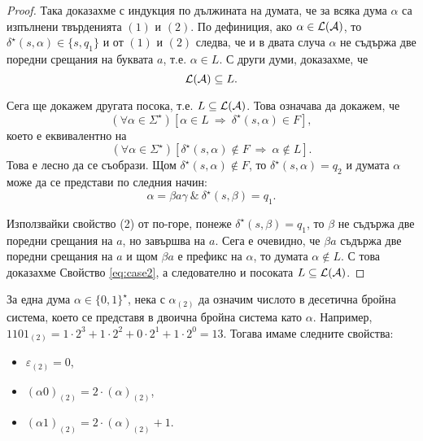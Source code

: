 \begin{proof}
 Така доказахме с индукция по дължината на думата, че за всяка дума $\alpha$
 са  изпълнени твърденията $(1)$ и $(2)$. По дефиниция, ако $\alpha \in \mathcal{L}(\mathcal{A})$,
 то $\delta^\star(s,\alpha) \in \{s,q_1\}$ и от $(1)$ и $(2)$ следва, че и в двата случа
 $\alpha$ не съдържа две поредни срещания на буквата $a$, т.е. $\alpha \in L$.
 С други думи, доказахме, че 
 \[\mathcal{L}(\mathcal{A}) \subseteq L.\]

 Сега ще докажем другата посока, т.е. $L \subseteq \mathcal{L}(\mathcal{A})$.
 Това означава да докажем, че
 \[(\forall \alpha \in \Sigma^\star)[\alpha \in L\ \Rightarrow\ \delta^\star(s,\alpha) \in F],\]
 което е еквивалентно на
 \begin{equation}
   \label{eq:case2}
   (\forall \alpha \in \Sigma^\star)[\delta^\star(s,\alpha) \not\in F \ \Rightarrow\ \alpha\not\in L].
 \end{equation}
 Това е лесно да се съобрази.
 Щом $\delta^\star(s,\alpha) \not\in F$, то 
 $\delta^\star(s,\alpha) = q_2$ и думата $\alpha$ може да се представи по следния начин:
 \[\alpha = \beta a \gamma\ \&\ \delta^\star(s,\beta) = q_1.\]
 
 Използвайки свойство (2) от по-горе, понеже $\delta^\star(s,\beta) = q_1$, то
 $\beta$ не съдържа две поредни срещания на $a$, но завършва на $a$.
 Сега е очевидно, че $\beta a$ съдържа две поредни срещания на $a$ и 
 щом $\beta a$ е префикс на $\alpha$, то думата $\alpha \not\in L$.
 С това доказахме Свойство \ref{eq:case2}, а следователно и посоката $L\subseteq \mathcal{L}(\mathcal{A})$.
\end{proof}

\begin{framed}
  За една дума $\alpha \in \{0,1\}^\star$, 
  нека с $\alpha_{(2)}$ да означим числото в десетична бройна система, което се представя в двоична бройна система като $\alpha$.
  Например, $1101_{(2)} = 1 \cdot 2^3+1\cdot 2^2+0\cdot 2^1+1\cdot 2^0 = 13$.
  Тогава имаме следните свойства:
  \begin{itemize}
  \item
    $\varepsilon_{(2)} = 0$,
  \item
    $(\alpha0)_{(2)} = 2\cdot(\alpha)_{(2)}$,
  \item
    $(\alpha1)_{(2)} = 2\cdot(\alpha)_{(2)} + 1$.
  \end{itemize}
\end{framed}

